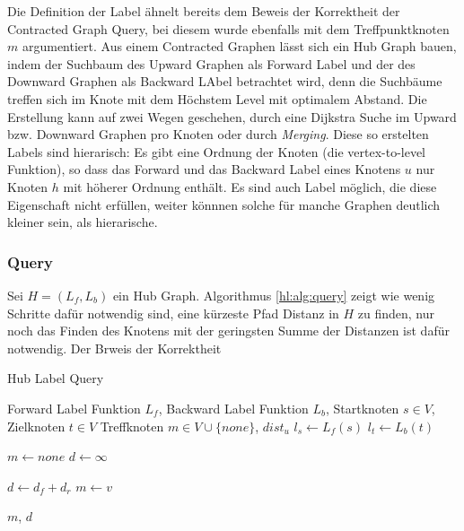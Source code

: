 Die Definition der Label ähnelt bereits dem Beweis der Korrektheit der Contracted Graph Query, bei diesem wurde ebenfalls mit dem Treffpunktknoten $m$ argumentiert.
Aus einem Contracted Graphen lässt sich ein Hub Graph bauen, indem der Suchbaum des Upward Graphen als Forward Label und der des Downward Graphen als Backward LAbel betrachtet wird, denn die Suchbäume treffen sich im Knote mit dem Höchstem Level mit optimalem Abstand.
Die Erstellung kann auf zwei Wegen geschehen, durch eine Dijkstra Suche im Upward bzw. Downward Graphen pro Knoten oder durch \emph{Merging}.
Diese so erstelten Labels sind hierarisch: Es gibt eine Ordnung der Knoten (die vertex-to-level Funktion), so dass das Forward und das Backward Label eines Knotens $u$ nur Knoten $h$ mit höherer Ordnung enthält.
Es sind auch Label möglich, die diese Eigenschaft nicht erfüllen, weiter könnnen solche für manche Graphen deutlich kleiner sein, als hierarische.\cite{goldberg2013separating}

\subsubsection{Query}

Sei $H = (L_f, L_b)$ ein Hub Graph.
Algorithmus \ref{hl:alg:query} zeigt wie wenig Schritte dafür notwendig sind, eine kürzeste Pfad Distanz in $H$ zu finden, nur noch das Finden des Knotens mit der geringsten Summe der Distanzen ist dafür notwendig.
Der Brweis der Korrektheit


\begin{algorithm}[ht]
    \caption{Hub Label Query}
    \begin{algorithmic}[1]
        \Require Forward Label Funktion $L_f$, Backward Label Funktion $L_b$, Startknoten $s \in V$, Zielknoten $t \in V$
        \Ensure Treffknoten $m \in V \cup \{ {none} \}$, ${dist}_u$
        \State $l_s \leftarrow L_f (s)$
        \State $l_t \leftarrow L_b (t)$

        \State
        \State $m \leftarrow {none}$
        \State $d \leftarrow \infty$

        \State $d \leftarrow d_f + d_r$
        \State $m \leftarrow v$
        \EndIf
        \EndFor

        \State
        \State \Return $m$, $d$
    \end{algorithmic}
    \label{hl:alg:query}
\end{algorithm}

